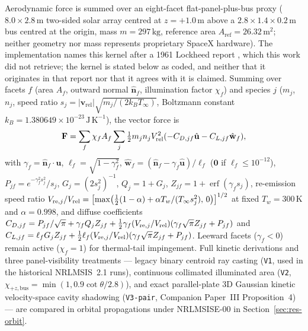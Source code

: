 \documentclass[12pt]{article}
\newcommand{\unit}[1]{\,\mathrm{#1}}
\begin{document}
Aerodynamic force is summed over an eight-facet flat-panel-plus-bus proxy ($8.0\times2.8\unit{m}$ two-sided solar array centred at $z = +1.0\unit{m}$ above a $2.8\times1.4\times0.2\unit{m}$ bus centred at the origin, mass $m=297\unit{kg}$, reference area $A_{\mathrm{ref}}=26.32\unit{m^2}$; neither geometry nor mass represents proprietary SpaceX hardware). The implementation names this kernel after a 1961 Lockheed report \citep{sentman1961}, which this work did not retrieve; the kernel is stated below as coded, and neither that it originates in that report nor that it agrees with it is claimed. Summing over facets $f$ (area $A_f$, outward normal $\hat{\mathbf{n}}_f$, illumination factor $\chi_f$) and species $j$ ($m_j$, $n_j$, speed ratio $s_j = |\mathbf{v}_{\mathrm{rel}}|\sqrt{m_j/(2k_B T_\infty)}$, Boltzmann constant $k_B = 1.380649\times10^{-23}\unit{J\,K^{-1}}$), the vector force is
\begin{equation}
\mathbf F=\sum_f\chi_f A_f\sum_j\tfrac12m_jn_jV_{\rm rel}^2
(-C_{D,jf}\hat{\mathbf u}-C_{L,jf}\hat{\mathbf w}_f),
\label{eq:facetforce}
\end{equation}
with $\gamma_f=\hat{\mathbf n}_f\cdot\hat{\mathbf u}$, $\ell_f=\sqrt{1-\gamma_f^2}$, $\hat{\mathbf{w}}_f = (\hat{\mathbf{n}}_f - \gamma_f\hat{\mathbf{u}})/\ell_f$ ($\mathbf{0}$ if $\ell_f \le 10^{-12}$), $P_{jf}=e^{-\gamma_f^2s_j^2}/s_j$, $G_j=(2s_j^2)^{-1}$, $Q_j=1+G_j$, $Z_{jf}=1+\operatorname{erf}(\gamma_f s_j)$, re-emission speed ratio $V_{{\rm re},j}/V_{\rm rel}=\bigl[\max\bigl(\tfrac12(1-\alpha)+\alpha T_w/(T_\infty s_j^2),\,0\bigr)\bigr]^{1/2}$ at fixed $T_w = 300\unit{K}$ and $\alpha = 0.998$, and diffuse coefficients $C_{D,jf}=P_{jf}/\sqrt\pi+\gamma_fQ_jZ_{jf}+\tfrac12\gamma_f(V_{{\rm re},j}/V_{\rm rel})(\gamma_f\sqrt\pi Z_{jf}+P_{jf})$ and $C_{L,jf}=\ell_fG_jZ_{jf}+\tfrac12\ell_f(V_{{\rm re},j}/V_{\rm rel})(\gamma_f\sqrt\pi Z_{jf}+P_{jf})$. Leeward facets ($\gamma_f < 0$) remain active ($\chi_f = 1$) for thermal-tail impingement. Full kinetic derivations and three panel-visibility treatments --- legacy binary centroid ray casting (\texttt{V1}, used in the historical NRLMSIS~2.1 runs), continuous collimated illuminated area (\texttt{V2}, $\chi_{+z,\mathrm{bus}} = \min(1, 0.9\cot\theta/2.8)$), and exact parallel-plate 3D Gaussian kinetic velocity-space cavity shadowing (\texttt{V3-pair}, Companion Paper~III Proposition~4) --- are compared in orbital propagations under NRLMSISE-00 in Section~\ref{sec:res-orbit}.
\end{document}
